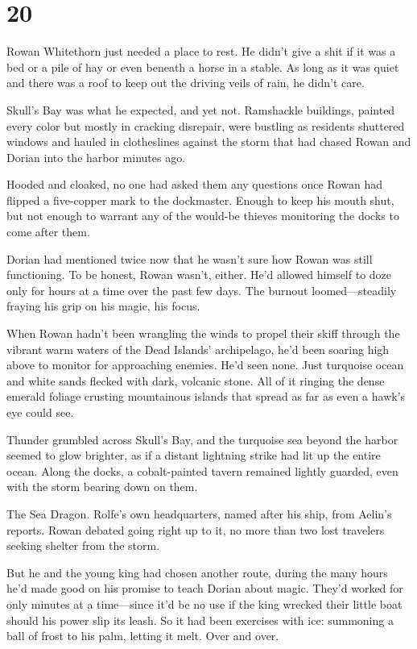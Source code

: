 
\chapter{20}

Rowan Whitethorn just needed a place to rest.
He didn't give a shit if it was a bed or a pile of hay or even beneath a horse in a stable.
As long as it was quiet and there was a roof to keep out the driving veils of rain, he didn't care.

Skull's Bay was what he expected, and yet not.
Ramshackle buildings, painted every color but mostly in cracking disrepair, were bustling as residents shuttered windows and hauled in clotheslines against the storm that had chased Rowan and Dorian into the harbor minutes ago.

Hooded and cloaked, no one had asked them any questions once Rowan had flipped a five-copper mark to the dockmaster.
Enough to keep his mouth shut, but not enough to warrant any of the would-be thieves monitoring the docks to come after them.

Dorian had mentioned twice now that he wasn't sure how Rowan was still functioning.
To be honest, Rowan wasn't, either.
He'd allowed himself to doze only for hours at a time over the past few days.
The burnout loomed---steadily fraying his grip on his magic, his focus.

When Rowan hadn't been wrangling the winds to propel their skiff through the vibrant warm waters of the Dead Islands' archipelago, he'd been soaring high above to monitor for approaching enemies.
He'd seen none.
Just turquoise ocean and white sands flecked with dark, volcanic stone.
All of it ringing the dense emerald foliage crusting mountainous islands that spread as far as even a hawk's eye could see.

Thunder grumbled across Skull's Bay, and the turquoise sea beyond the harbor seemed to glow brighter, as if a distant lightning strike had lit up the entire ocean.
Along the docks, a cobalt-painted tavern remained lightly guarded, even with the storm bearing down on them.

The Sea Dragon.
Rolfe's own headquarters, named after his ship, from Aelin's reports.
Rowan debated going right up to it, no more than two lost travelers seeking shelter from the storm.

But he and the young king had chosen another route, during the many hours he'd made good on his promise to teach Dorian about magic.
They'd worked for only minutes at a time---since it'd be no use if the king wrecked their little boat should his power slip its leash.
So it had been exercises with ice: summoning a ball of frost to his palm, letting it melt.
Over and over.


